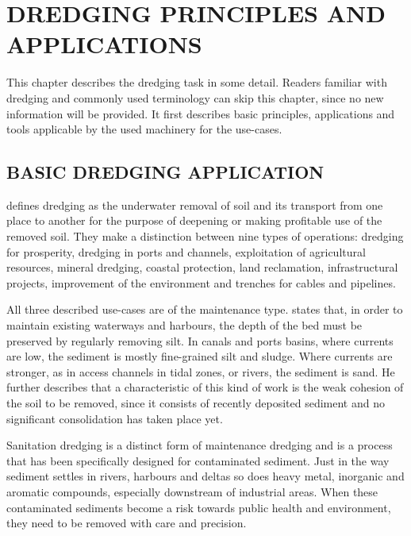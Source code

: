 \chapter{DREDGING PRINCIPLES AND APPLICATIONS}\label{chap:dredgingprocess}
This chapter describes the dredging task in some detail. Readers familiar with dredging and commonly used terminology
can skip this chapter, since no new information will be provided. It first describes basic principles, applications and
tools applicable by the used machinery for the use-cases.

\section{BASIC DREDGING APPLICATION}\label{sec:basic dredging applications}
\citet{training_institute_for_dredging_ingewijden_2008} defines dredging as the underwater removal of soil and its
transport from one place to another for the purpose of deepening or making profitable use of the removed soil. They make
a distinction between nine types of operations: dredging for prosperity, dredging in ports and channels, exploitation of
agricultural resources, mineral dredging, coastal protection, land reclamation, infrastructural projects, improvement of
the environment and trenches for cables and pipelines.

All three described use-cases are of the maintenance type. \citet{van_der_schrieck_dredging_2014} states that, in order
to maintain existing waterways and harbours, the depth of the bed must be preserved by regularly removing silt. In
canals and ports basins, where currents are low, the sediment is mostly fine-grained silt and sludge. Where currents are
stronger, as in access channels in tidal zones, or rivers, the sediment is sand. He further describes that a
characteristic of this kind of work is the weak cohesion of the soil to be removed, since it consists of recently
deposited sediment and no significant consolidation has taken place yet.

Sanitation dredging is a distinct form of maintenance dredging and is a process that has been specifically designed for
contaminated sediment. Just in the way sediment settles in rivers, harbours and deltas so does heavy metal, inorganic
and aromatic compounds, especially downstream of industrial areas. When these contaminated sediments become a risk
towards public health and environment, they need to be removed with care and precision.


